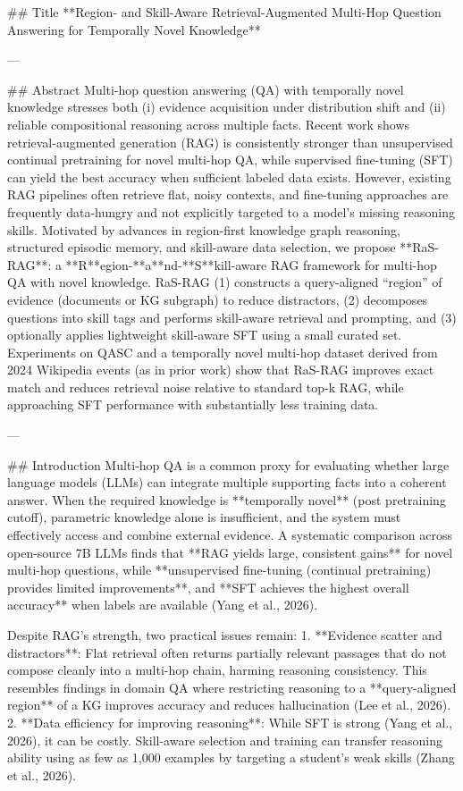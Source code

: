 ## Title  
**Region- and Skill-Aware Retrieval-Augmented Multi-Hop Question Answering for Temporally Novel Knowledge**

---

## Abstract  
Multi-hop question answering (QA) with temporally novel knowledge stresses both (i) evidence acquisition under distribution shift and (ii) reliable compositional reasoning across multiple facts. Recent work shows retrieval-augmented generation (RAG) is consistently stronger than unsupervised continual pretraining for novel multi-hop QA, while supervised fine-tuning (SFT) can yield the best accuracy when sufficient labeled data exists. However, existing RAG pipelines often retrieve flat, noisy contexts, and fine-tuning approaches are frequently data-hungry and not explicitly targeted to a model’s missing reasoning skills. Motivated by advances in region-first knowledge graph reasoning, structured episodic memory, and skill-aware data selection, we propose **RaS-RAG**: a **R**egion-**a**nd-**S**kill-aware RAG framework for multi-hop QA with novel knowledge. RaS-RAG (1) constructs a query-aligned “region” of evidence (documents or KG subgraph) to reduce distractors, (2) decomposes questions into skill tags and performs skill-aware retrieval and prompting, and (3) optionally applies lightweight skill-aware SFT using a small curated set. Experiments on QASC and a temporally novel multi-hop dataset derived from 2024 Wikipedia events (as in prior work) show that RaS-RAG improves exact match and reduces retrieval noise relative to standard top‑k RAG, while approaching SFT performance with substantially less training data.  

---

## Introduction  
Multi-hop QA is a common proxy for evaluating whether large language models (LLMs) can integrate multiple supporting facts into a coherent answer. When the required knowledge is **temporally novel** (post pretraining cutoff), parametric knowledge alone is insufficient, and the system must effectively access and combine external evidence. A systematic comparison across open-source 7B LLMs finds that **RAG yields large, consistent gains** for novel multi-hop questions, while **unsupervised fine-tuning (continual pretraining) provides limited improvements**, and **SFT achieves the highest overall accuracy** when labels are available (Yang et al., 2026).  

Despite RAG’s strength, two practical issues remain:  
1. **Evidence scatter and distractors**: Flat retrieval often returns partially relevant passages that do not compose cleanly into a multi-hop chain, harming reasoning consistency. This resembles findings in domain QA where restricting reasoning to a **query-aligned region** of a KG improves accuracy and reduces hallucination (Lee et al., 2026).  
2. **Data efficiency for improving reasoning**: While SFT is strong (Yang et al., 2026), it can be costly. Skill-aware selection and training can transfer reasoning ability using as few as 1,000 examples by targeting a student’s weak skills (Zhang et al., 2026).  

